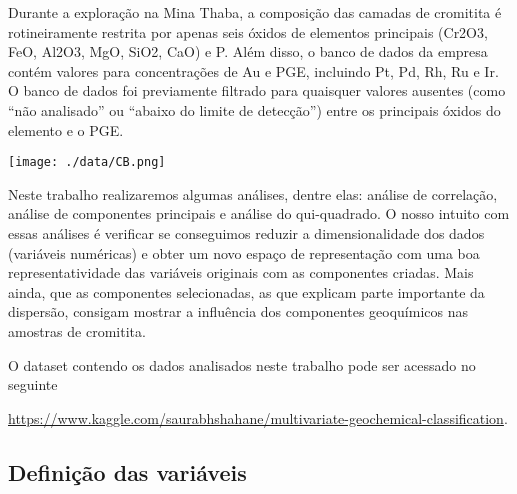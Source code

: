 \documentclass[
]{article}
\begin{document}
Durante a exploração na Mina Thaba, a composição das camadas de cromitita é rotineiramente restrita por apenas seis óxidos de elementos principais (Cr2O3, FeO, Al2O3, MgO, SiO2, CaO) e P. Além disso, o banco de dados da empresa contém valores para concentrações de Au e PGE, incluindo Pt, Pd, Rh, Ru e Ir. O banco de dados foi previamente filtrado para quaisquer valores ausentes (como ``não analisado'' ou ``abaixo do limite de detecção'') entre os principais óxidos do elemento e o PGE.

\texttt{[image: ./data/CB.png]}

Neste trabalho realizaremos algumas análises, dentre elas: análise de correlação, análise de componentes principais e análise do qui-quadrado. O nosso intuito com essas análises é verificar se conseguimos reduzir a dimensionalidade dos dados (variáveis numéricas) e obter um novo espaço de representação com uma boa representatividade das variáveis originais com as componentes criadas. Mais ainda, que as componentes selecionadas, as que explicam parte importante da dispersão, consigam mostrar a influência dos componentes geoquímicos nas amostras de cromitita.

O dataset contendo os dados analisados neste trabalho pode ser acessado no seguinte

\url{https://www.kaggle.com/saurabhshahane/multivariate-geochemical-classification}.

\hypertarget{definiuxe7uxe3o-das-variuxe1veis}{%
\subsection*{Definição das variáveis}\label{definiuxe7uxe3o-das-variuxe1veis}}
\end{document}
